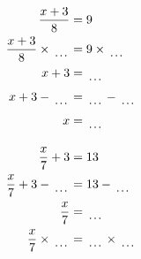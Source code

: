 \documentclass[12pt]{article}
\newcounter{minipagecount}
\begin{document}
\begin{multicols}{2}
\begin{minipage}[t]{0.45\textwidth}
    \raggedright %
    \begin{align*} %
        \frac{x + 3}{8} &= 9\\
        \frac{x + 3}{8} \times\dotuline{\hspace{5mm}} &= 9 \times\dotuline{\hspace{5mm}}\\
        x + 3 &= \dotuline{\hspace{5mm}}\\
        x + 3 - \dotuline{\hspace{5mm}} &= \dotuline{\hspace{5mm}} - \dotuline{\hspace{5mm}}\\
        x &= \dotuline{\hspace{5mm}}\\
    \end{align*}
\end{minipage} %
\noindent{(\theminipagecount)}\hspace{0.1mm} %
\begin{minipage}[t]{0.45\textwidth} %
    \vspace{-26pt}  %
    \raggedright %
    \begin{align*} %
        \frac{x}{7} + 3 &= 13\\
        \frac{x}{7} + 3 - \dotuline{\hspace{5mm}} &= 13 - \dotuline{\hspace{5mm}}\\
        \frac{x}{7} &= \dotuline{\hspace{5mm}}\\
        \frac{x}{7} \times\dotuline{\hspace{5mm}} &= \dotuline{\hspace{5mm}} \times\dotuline{\hspace{5mm}}\\

\end{align*}
\end{minipage}
\end{multicols}
\end{document}
